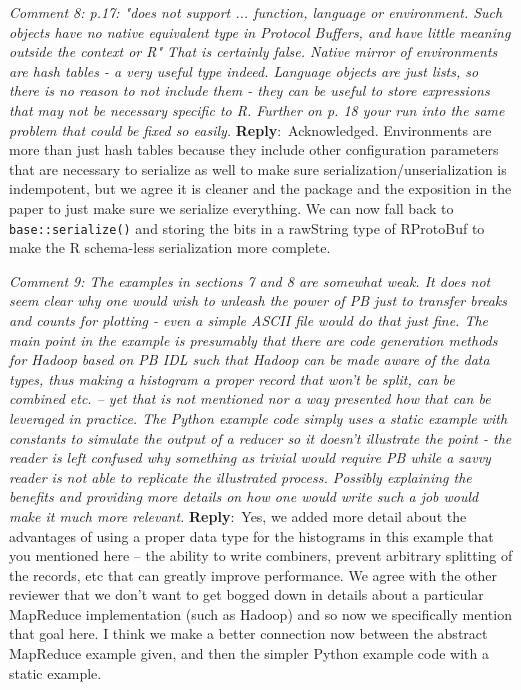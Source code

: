 \documentclass[10pt]{article}
\newcommand{\pointRaised}[2]{\smallskip %
  \textsl{{\fontseries{b}\selectfont #1}: #2}\newline}
\newcommand{\reply}[1]{\textbf{Reply}:\ #1 \smallskip } %
\begin{document}
\pointRaised{Comment 8}{p.17: "does not support ... function, language or environment. Such 
  objects have no native equivalent type in Protocol Buffers, and have 
  little meaning outside the context or R"
  That is certainly false. Native mirror of environments are hash tables - 
  a very useful type indeed. Language objects are just lists, so there is
  no reason to not include them - they can be useful to store expressions
  that may not be necessary specific to R. Further on p. 18 your run into
  the same problem that could be fixed so easily.}
\reply{Acknowledged.  Environments are more than just hash
  tables because they include other configuration parameters that are
  necessary to serialize as well to make sure
  serialization/unserialization is indempotent, but we agree it is
  cleaner and the package and the exposition in the paper to just make
  sure we serialize everything.  We can now fall back to
  \texttt{base::serialize()} and storing the bits in a rawString type of
  RProtoBuf to make the R schema-less serialization more complete.}

\pointRaised{Comment 9}{The examples in sections 7 and 8 are somewhat weak. It does not seem 
  clear why one would wish to unleash the power of PB just to transfer 
  breaks and counts for plotting - even a simple ASCII file would do that
  just fine. The main point in the example is presumably that there are 
  code generation methods for Hadoop based on PB IDL such that Hadoop can
  be made aware of the data types, thus making a histogram a proper record 
  that won't be split, can be combined etc. -- yet that is not mentioned 
  nor a way presented how that can be leveraged in practice. The Python 
  example code simply uses a static example with constants to simulate the 
  output of a reducer so it doesn't illustrate the point - the reader is 
  left confused why something as trivial would require PB while a savvy 
  reader is not able to replicate the illustrated process. Possibly 
  explaining the benefits and providing more details on how one would 
  write such a job would make it much more relevant.}
\reply{Yes, we added more detail about the advantages of using a
  proper data type for the histograms in this example that you mentioned here -- the
  ability to write combiners, prevent arbitrary splitting of the
  records, etc that can greatly improve performance.  We agree with
  the other reviewer that we don't want to get bogged down in details
  about a particular MapReduce implementation (such as Hadoop) and so
  now we specifically mention that goal here.
  I think we make a better connection now between the
  abstract MapReduce example given, and then the simpler Python
  example code with a static example.}
\end{document}

